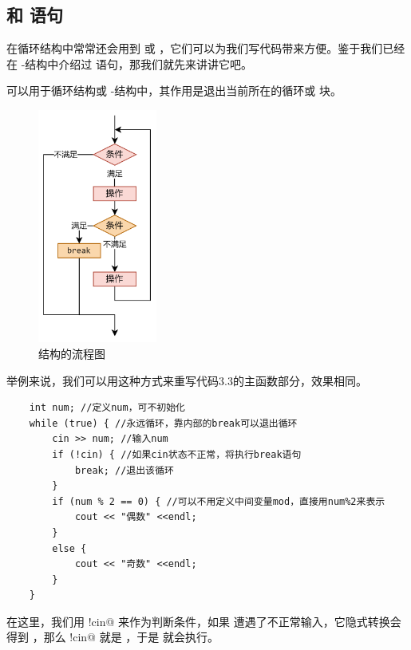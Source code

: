 \subsection*{\lstinline@continue@ 和 \lstinline@break@ 语句}
在循环结构中常常还会用到 \lstinline@continue@ 或 \lstinline@break@，它们可以为我们写代码带来方便。鉴于我们已经在 \lstinline@switch@-\lstinline@case@ 结构中介绍过 \lstinline@break@ 语句，那我们就先来讲讲它吧。\par
\lstinline@break@ 可以用于循环结构或 \lstinline@switch@-\lstinline@case@ 结构中，其作用是退出当前所在的循环或 \lstinline@switch@ 块。\par
\begin{figure}[htbp]
    \centering
    \includegraphics[width=0.35\textwidth]{../images/generalized_parts/03_structure_of_break.png}
    \caption{\lstinline@break@ 结构的流程图}
\end{figure}
举例来说，我们可以用这种方式来重写代码3.3的主函数部分，效果相同。
\begin{lstlisting}
    int num; //定义num，可不初始化
    while (true) { //永远循环，靠内部的break可以退出循环
        cin >> num; //输入num
        if (!cin) { //如果cin状态不正常，将执行break语句
            break; //退出该循环
        }
        if (num % 2 == 0) { //可以不用定义中间变量mod，直接用num%2来表示
            cout << "偶数" <<endl;
        }
        else {
            cout << "奇数" <<endl;
        }
    }
\end{lstlisting}
在这里，我们用 \lstinline@!cin@ 来作为判断条件，如果 \lstinline@cin@ 遭遇了不正常输入，它隐式转换会得到 \lstinline@false@，那么 \lstinline@!cin@ 就是 \lstinline@true@，于是 \lstinline@break@ 就会执行。\par
